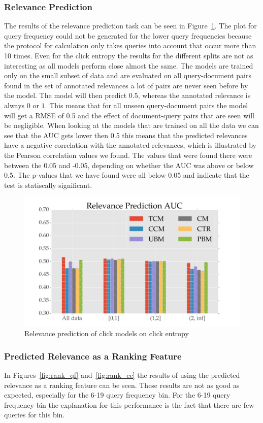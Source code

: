 \subsubsection{Relevance Prediction}
The results of the relevance prediction task can be seen in Figure~\ref{fig:rel_ce}. The plot for query frequency could not be generated for the lower query frequencies because the protocol for calculation only takes queries into account that occur more than 10 times. Even for the click entropy the results for the different splits are not as interesting as all models perform close almost the same. The models are trained only on the small subset of data and are evaluated on all query-document pairs found in the set of annotated relevances a lot of pairs are never seen before by the model. The model will then predict $0.5$, whereas the annotated relevance is always $0$ or $1$. This means that for all unseen query-document pairs the model will get a RMSE of 0.5 and the effect of document-query pairs that are seen will be negligible. When looking at the models that are trained on all the data we can see that the AUC gets lower then 0.5 this means that the predicted relevances have a negative correlation with the annotated relevances, which is illustrated by the Pearson correlation values we found. The values that were found there were between the 0.05 and -0.05, depending on whether the AUC was above or below 0.5. The p-values that we have found were all below 0.05 and indicate that the test is statiscally significant.

\begin{figure}
	\centering
	\includegraphics[width=.49\textwidth]{figures/Rel_Pred_AUC_ce.pdf}
	\caption{Relevance prediction of click models on click entropy}
	\label{fig:rel_ce}
\end{figure}

\subsubsection{Predicted Relevance as a Ranking Feature}
In Figures~\ref{fig:rank_qf} and~\ref{fig:rank_ce} the results of using the predicted relevance as a ranking feature can be seen. These results are not as good as expected, especially for the 6-19 query frequency bin. For the 6-19 query frequency bin the explanation for this performance is the fact that there are few queries for this bin. 


